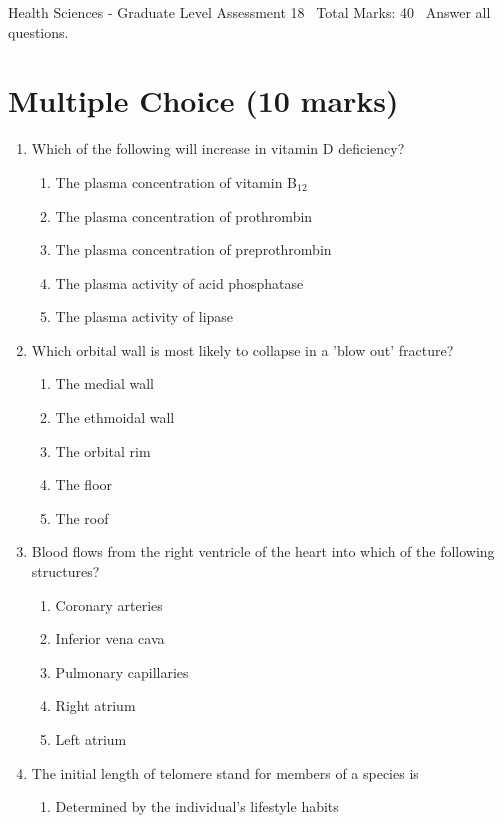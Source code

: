 \documentclass[12pt]{article}
\begin{document}
\begin{center}
Health Sciences - Graduate Level Assessment 18 \
Total Marks: 40 \
Answer all questions.
\end{center}

\section*{Multiple Choice (10 marks)}
\begin{enumerate}[label=\arabic*.]
\item Which of the following will increase in vitamin D deficiency?
\begin{enumerate}[label=(\alph*)]
    \item The plasma concentration of vitamin B$_{12}$
    \item The plasma concentration of prothrombin
    \item The plasma concentration of preprothrombin
    \item The plasma activity of acid phosphatase
    \item The plasma activity of lipase
\end{enumerate}
\item Which orbital wall is most likely to collapse in a 'blow out' fracture?
\begin{enumerate}[label=(\alph*)]
    \item The medial wall
    \item The ethmoidal wall
    \item The orbital rim
    \item The floor
    \item The roof
\end{enumerate}
\item Blood flows from the right ventricle of the heart into which of the following structures?
\begin{enumerate}[label=(\alph*)]
    \item Coronary arteries
    \item Inferior vena cava
    \item Pulmonary capillaries
    \item Right atrium
    \item Left atrium
\end{enumerate}
\item The initial length of telomere stand for members of a species is
\begin{enumerate}[label=(\alph*)]
    \item Determined by the individual's lifestyle habits

\end{enumerate}
\end{enumerate}
\end{document}
